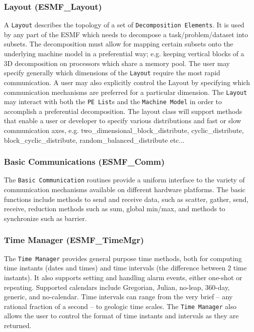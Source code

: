 \subsubsection{Layout (ESMF\_Layout)}
\label{sec:layout} 
A {\tt Layout} describes the topology of a set of {\tt Decomposition 
Elements}.
It is used by any part of the ESMF which needs
to decompose a task/problem/dataset into subsets.
The decomposition must allow for mapping certain subsets onto the
underlying machine model in a preferential way; e.g. keeping
vertical blocks of a 3D decomposition on processors which share
a memory pool.  The user may specify generally which 
dimensions of the {\tt Layout} require the most rapid communication.
A user may also explicitly control the {Layout} by specifying which 
communication mechanisms are preferred for a particular dimension.
The {\tt Layout} may interact with both the {\tt PE List}s
and the {\tt Machine Model} in order to accomplish a preferential
decomposition. The layout class will support methods that enable a user or
developer to specify various distributions and fast or slow 
communication axes, e.g. two\_dimensional\_block\_distribute,
cyclic\_distribute, block\_cyclic\_distribute, random\_balanced\_distribute 
etc...


\subsubsection{Basic Communications (ESMF\_Comm)}
\label{sec:basiccomm} 
The {\tt Basic Communication} routines provide a uniform 
interface to the variety of communication mechanisms available
on different hardware platforms.  
The basic functions include methods to send
and receive data, such as scatter, gather, send, receive,
reduction methods such as sum, global min/max, and methods
to synchronize such as barrier. 

\subsubsection{Time Manager (ESMF\_TimeMgr)}
\label{sec:timemgr} 
The {\tt Time Manager} provides general purpose time methods, both
for computing time instants (dates and times) and time intervals
(the difference between 2 time instants).   It also supports 
setting and handling alarm events, either one-shot or repeating.
Supported calendars include Gregorian, Julian, no-leap, 360-day, 
generic, and no-calendar.
Time intervals can range from the very brief -- any rational fraction
of a second -- to geologic time scales.
The {\tt Time Manager} also allows the user to control the format of
time instants and intervals as they are returned.

